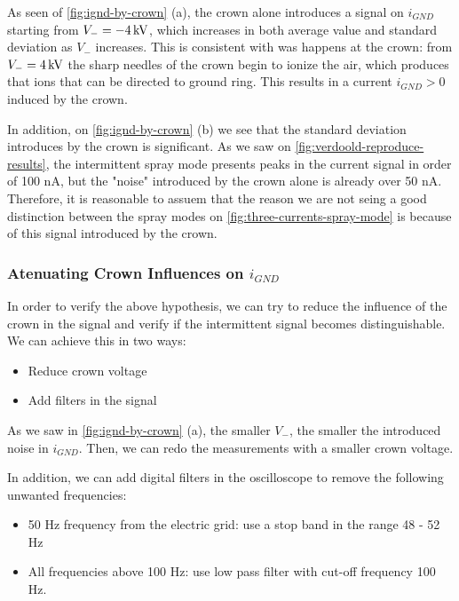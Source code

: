 \documentclass[oneside,12pt]{article}
\begin{document}
As seen of \autoref{fig:ignd-by-crown} (a), the crown alone introduces a signal on $i_{GND}$ starting
from $V_- = - 4 \,\mathrm{kV}$, which increases in both average value and standard deviation as $V_-$ increases.
This is consistent with was happens at the crown: from $V_- = 4 \,\mathrm{kV}$ the sharp needles 
of the crown begin to ionize the air, which produces that ions that can be 
directed to ground ring. This results in a current $i_{GND} > 0$ induced by the crown.

In addition, on \autoref{fig:ignd-by-crown} (b) we see that the standard deviation introduces by the crown
is significant. As we saw on \autoref{fig:verdoold-reproduce-results}, the intermittent spray mode 
presents peaks in the current signal in order of 100 nA, but the "noise" introduced by the 
crown alone is already over 50 nA. Therefore, it is reasonable to assuem that the reason we are
not seing a good distinction between the spray modes on \autoref{fig:three-currents-spray-mode} is 
because of this signal introduced by the crown.

\subsubsection{Atenuating Crown Influences on $i_{GND}$}

In order to verify the above hypothesis, we can try to reduce the influence of the crown
in the signal and verify if the intermittent signal becomes distinguishable. We can achieve this in two ways:

\begin{itemize}
    \item Reduce crown voltage
    \item Add filters in the signal
\end{itemize}

As we saw in \autoref{fig:ignd-by-crown} (a), the smaller $V_-$, the smaller the introduced 
noise in $i_{GND}$. Then, we can redo the measurements with a smaller crown voltage.

In addition, we can add digital filters in the oscilloscope to remove the following unwanted
frequencies:

\begin{itemize}
    \item 50 Hz frequency from the electric grid: use a stop band in the range 48 - 52 Hz
    \item All frequencies above 100 Hz: use low pass filter with cut-off frequency 100 Hz.
\end{itemize}
\end{document}
